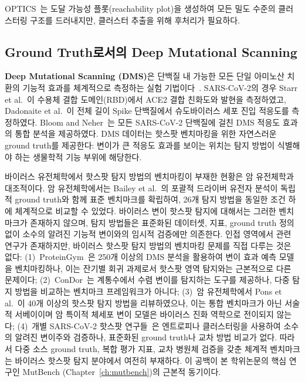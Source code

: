 OPTICS~\cite{ankerst1999optics}는 도달 가능성 플롯(reachability plot)을 생성하여 모든 밀도 수준의 클러스터링 구조를 드러내지만, 클러스터 추출을 위해 후처리가 필요하다.

\subsection{Ground Truth로서의 Deep Mutational Scanning}
\label{subsec:bg_dms}

\textbf{Deep Mutational Scanning (DMS)}은 단백질 내 가능한 모든 단일 아미노산 치환의 기능적 효과를 체계적으로 측정하는 실험 기법이다~\cite{fowler2014dms}.
SARS-CoV-2의 경우 Starr et al.~\cite{starr2020dms}이 수용체 결합 도메인(RBD)에서 ACE2 결합 친화도와 발현을 측정하였고, Dadonaite et al.~\cite{dadonaite2023dms}이 전체 길이 Spike 단백질에서 슈도바이러스 세포 진입 적응도를 측정하였다.
Bloom and Neher~\cite{bloom2023fitness}는 모든 SARS-CoV-2 단백질에 걸친 DMS 적응도 효과의 통합 분석을 제공하였다.
DMS 데이터는 핫스팟 벤치마킹을 위한 자연스러운 ground truth를 제공한다: 변이가 큰 적응도 효과를 보이는 위치는 탐지 방법이 식별해야 하는 생물학적 기능 부위에 해당한다.


바이러스 유전체학에서 핫스팟 탐지 방법의 벤치마킹이 부재한 현황은 암 유전체학과 대조적이다.
암 유전체학에서는 Bailey et al.~\cite{bailey2018comprehensive}의 포괄적 드라이버 유전자 분석이 독립적 ground truth와 함께 표준 벤치마크를 확립하여, 26개 탐지 방법을 동일한 조건 하에 체계적으로 비교할 수 있었다.
바이러스 변이 핫스팟 탐지에 대해서는 그러한 벤치마크가 존재하지 않으며, 탐지 방법들은 표준화된 데이터셋, 지표, ground truth 정의 없이 소수의 알려진 기능적 변이와의 임시적 검증에만 의존한다.
인접 영역에서 관련 연구가 존재하지만, 바이러스 핫스팟 탐지 방법의 벤치마킹 문제를 직접 다루는 것은 없다:
(1)~ProteinGym~\cite{notin2023proteingym}은 250개 이상의 DMS 분석을 활용하여 변이 효과 예측 모델을 벤치마킹하나, 이는 잔기별 회귀 과제로서 핫스팟 영역 탐지와는 근본적으로 다른 문제이다;
(2)~ConDor~\cite{morel2024condor}는 계통수에서 수렴 변이를 탐지하는 도구를 제공하나, 다중 탐지 방법을 비교하는 벤치마크 프레임워크가 아니다;
(3)~암 유전체학에서 Pons et al.~\cite{pons2020computational}이 40개 이상의 핫스팟 탐지 방법을 리뷰하였으나, 이는 통합 벤치마크가 아닌 서술적 서베이이며 암 특이적 체세포 변이 모델은 바이러스 진화 역학으로 전이되지 않는다;
(4)~개별 SARS-CoV-2 핫스팟 연구들~\cite{harvey2021tracking}은 엔트로피나 클러스터링을 사용하여 소수의 알려진 변이주와 검증하나, 표준화된 ground truth나 교차 방법 비교가 없다.
따라서 다중 소스 ground truth, 복합 평가 지표, 교차 병원체 검증을 갖춘 체계적 벤치마크는 바이러스 핫스팟 탐지 분야에서 여전히 부재하다.
이 공백이 본 학위논문의 핵심 연구인 MutBench (Chapter~\ref{ch:mutbench})의 근본적 동기이다.



